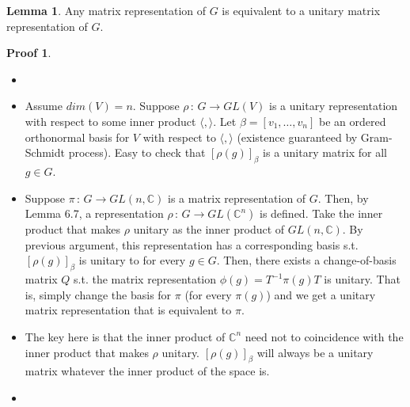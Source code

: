 \documentclass{book}
\newcommand{\C}{\mathbb{C}}
\newcommand{\inner}[1]{\langle #1 \rangle}
\theoremstyle{definition}
\newtheorem{lemma}{Lemma}[chapter]
\theoremstyle{remarkstyle}
\newtheorem*{myproof}{Proof}%
\begin{document}
\begin{lemma}
    Any matrix representation of $G$ is equivalent to a unitary matrix representation of $G$.
\end{lemma}
\begin{myproof}
    \begin{itemize}
        \item[]
        \item Assume $dim(V)=n$. Suppose $\rho\,:\, G\rightarrow GL(V)$ is a unitary representation with respect to some inner product $\inner{,}$. Let $\beta=[v_1,\dots,v_n] $ be an ordered orthonormal basis for $V$ with respect to $\inner{,}$ (existence guaranteed by Gram-Schmidt process). Easy to check that $[\rho(g)]_\beta $ is a unitary matrix for all $g\in G$.
        \item Suppose $\pi\,:\,G\rightarrow GL(n,\C)$ is a matrix representation of $G$. Then, by Lemma 6.7, a representation $\rho\,:\, G\rightarrow GL(\C^n)$ is defined. Take the inner product that makes $\rho$ unitary as the inner product of $GL(n,\C)$. By previous argument, this representation has a corresponding basis s.t. $[\rho(g)]_\beta $ is unitary to for every $g\in G$. Then, there exists a change-of-basis matrix $Q$ s.t. the matrix representation $\phi(g)=T^{-1}\pi(g)T $ is unitary. That is, simply change the basis for $\pi$ (for every $\pi(g)$) and we get a unitary matrix representation that is equivalent to $\pi$.
        \item The key here is that the inner product of $\C^n$ need not to coincidence with the inner product that makes $\rho$ unitary. $[\rho(g)]_\beta $ will always be a unitary matrix whatever the inner product of the space is.
        \item[] 
    \end{itemize}
\end{myproof}
\end{document}
